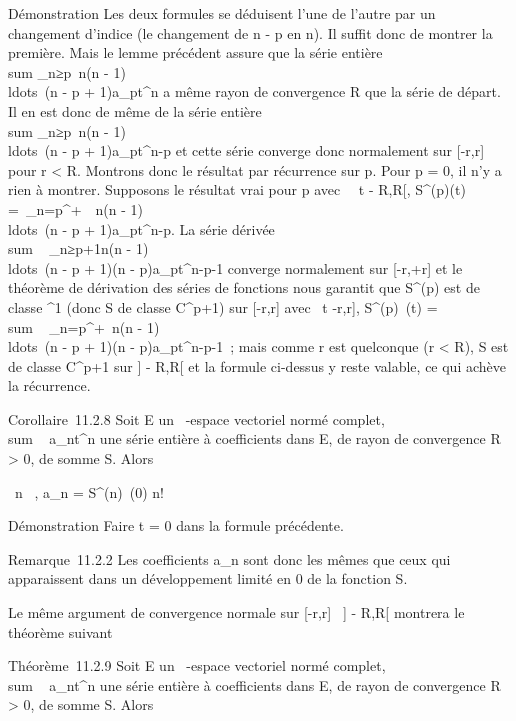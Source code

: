 \documentclass[]{article}
\begin{document}
Démonstration Les deux formules se déduisent l'une de l'autre par un
changement d'indice (le changement de n - p en n). Il suffit donc de
montrer la première. Mais le lemme précédent assure que la série entière
\\sum  _n≥p~n(n
- 1)\\ldots~(n - p +
1)a_pt^n a même rayon de convergence R que la série
de départ. Il en est donc de même de la série entière
\\sum  _n≥p~n(n
- 1)\\ldots~(n - p +
1)a_pt^n-p et cette série converge donc normalement
sur {[}-r,r{]} pour r \textless{} R. Montrons donc le résultat par
récurrence sur p. Pour p = 0, il n'y a rien à montrer. Supposons le
résultat vrai pour p avec \forall~~t \in{]} - R,R{[},
S^(p)(t) =\
\sum  _n=p^+\infty~~n(n -
1)\\ldots~(n - p +
1)a_pt^n-p. La série dérivée
\\sum ~
_n≥p+1n(n -
1)\\ldots~(n - p +
1)(n - p)a_pt^n-p-1 converge normalement sur
{[}-r,+r{]} et le théorème de dérivation des séries de fonctions nous
garantit que S^(p) est de classe \mathcal{C}^1 (donc S de
classe C^p+1) sur {[}-r,r{]} avec
\forall~t \in {[}-r,r{]}, S^(p)~(t)
= \\sum ~
_n=p^+\infty~n(n -
1)\\ldots~(n - p +
1)(n - p)a_pt^n-p-1~; mais comme r est quelconque (r
\textless{} R), S est de classe C^p+1 sur {]} - R,R{[} et la
formule ci-dessus y reste valable, ce qui achève la récurrence.

Corollaire~11.2.8 Soit E un ~-espace vectoriel normé complet,
\\sum ~
a_nt^n une série entière à coefficients dans E, de
rayon de convergence R \textgreater{} 0, de somme S. Alors

\forall~n \in {}~, a_n = S^(n)~(0)
\over n!

Démonstration Faire t = 0 dans la formule précédente.

Remarque~11.2.2 Les coefficients a_n sont donc les mêmes que
ceux qui apparaissent dans un développement limité en 0 de la fonction
S.

Le même argument de convergence normale sur {[}-r,r{]} \subset~{]} - R,R{[}
montrera le théorème suivant

Théorème~11.2.9 Soit E un ~-espace vectoriel normé complet,
\\sum ~
a_nt^n une série entière à coefficients dans E, de
rayon de convergence R \textgreater{} 0, de somme S. Alors
\end{document}
